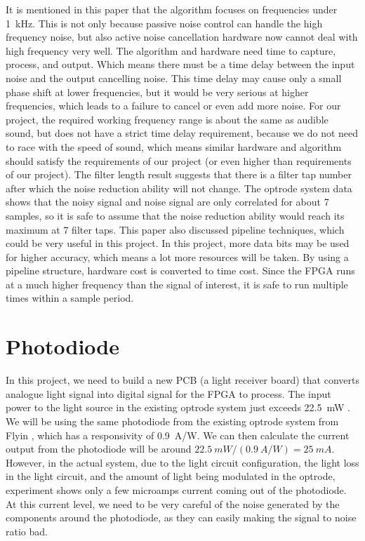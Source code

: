 It is mentioned in this paper that the algorithm focuses on frequencies under \qty{1}{kHz}.  This is not only because passive noise control can handle the high frequency noise, but also active noise cancellation hardware now cannot deal with high frequency very well.  The algorithm and hardware need time to capture, process, and output.  Which means there must be a time delay between the input noise and the output cancelling noise.  This time delay may cause only a small phase shift at lower frequencies, but it would be very serious at higher frequencies, which leads to a failure to cancel or even add more noise.  For our project, the required working frequency range is about the same as audible sound, but does not have a strict time delay requirement, because we do not need to race with the speed of sound, which means similar hardware and algorithm should satisfy the requirements of our project (or even higher than requirements of our project).  The filter length result suggests that there is a filter tap number after which the noise reduction ability will not change.  The optrode system data shows that the noisy signal and noise signal are only correlated for about 7 samples, so it is safe to assume that the noise reduction ability would reach its maximum at 7 filter taps.  This paper also discussed pipeline techniques, which could be very useful in this project.  In this project, more data bits may be used for higher accuracy, which means a lot more resources will be taken.  By using a pipeline structure, hardware cost is converted to time cost.  Since the FPGA runs at a much higher frequency than the signal of interest, it is safe to run multiple times within a sample period.

\section{Photodiode}

In this project, we need to build a new PCB (a light receiver board) that converts analogue light signal into digital signal for the FPGA to process.  The input power to the light source in the existing optrode system just exceeds \qty{22.5}{mW} \cite{OptrodePower}.  We will be using the same photodiode from the existing optrode system from Flyin \cite{Flyin}, which has a responsivity of \qty{0.9}{A/W}.  We can then calculate the current output from the photodiode will be around $\qty{22.5}{mW}/(\qty{0.9}{A/W})=\qty{25}{mA}$.  However, in the actual system, due to the light circuit configuration, the light loss in the light circuit, and the amount of light being modulated in the optrode, experiment shows only a few microamps current coming out of the photodiode.  At this current level, we need to be very careful of the noise generated by the components around the photodiode, as they can easily making the signal to noise ratio bad.

